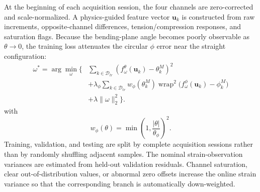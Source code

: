 \documentclass[journal,twoside]{IEEEtran}
\newcommand{\wrap}{\operatorname{wrap}}
\begin{document}
At the beginning of each acquisition session, the four channels are zero-corrected and scale-normalized. A physics-guided feature vector $\mathbf u_k$ is constructed from raw increments, opposite-channel differences, tension/compression responses, and saturation flags. Because the bending-plane angle becomes poorly observable as $\theta\rightarrow0$, the training loss attenuates the circular $\phi$ error near the straight configuration:
\begin{equation}
\begin{aligned}
\omega^*=\arg\min_\omega\Bigg\{&
\sum_{k\in\mathcal D_{tr}}(f_\omega^\theta(\mathbf u_k)-\theta_k^M)^2\\
&+\lambda_\phi\sum_{k\in\mathcal D_{tr}}w_\phi(\theta_k^M)
\wrap^2\!\big(f_\omega^\phi(\mathbf u_k)-\phi_k^M\big)\\
&+\lambda\|\omega\|_2^2\Bigg\}.
\end{aligned}
\label{eq:strain_training}
\end{equation}
with
\begin{equation}
w_\phi(\theta)=\min\!\left(1,\frac{|\theta|}{\theta_\phi}\right)^2.
\label{eq:phi_weight}
\end{equation}
Training, validation, and testing are split by complete acquisition sessions rather than by randomly shuffling adjacent samples. The nominal strain-observation variances are estimated from held-out validation residuals. Channel saturation, clear out-of-distribution values, or abnormal zero offsets increase the online strain variance so that the corresponding branch is automatically down-weighted.
\end{document}
